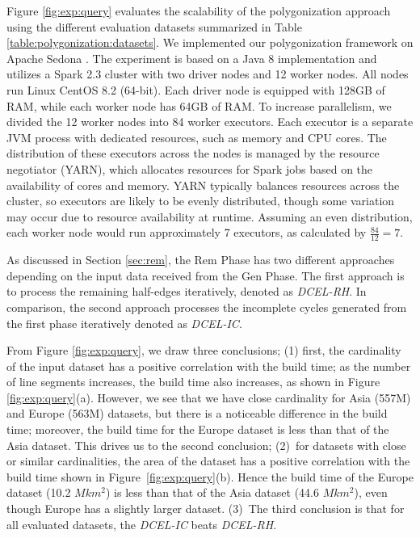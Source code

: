 Figure \ref{fig:exp:query} evaluates the scalability of the polygonization approach using the different evaluation datasets summarized in Table 
\ref{table:polygonization:datasets}.  We implemented our polygonization framework on Apache Sedona \cite{yu_spatial_2018}. The experiment is based on a Java 8  
implementation and utilizes a Spark 2.3 cluster with two driver nodes and 12 worker nodes. All nodes run Linux CentOS 8.2 (64-bit). Each driver node is equipped 
with 128GB of RAM, while each worker node has 64GB of RAM. To increase parallelism, we divided the 12 worker nodes into 84 worker executors. Each executor is a 
separate JVM process with dedicated resources, such as memory and CPU cores. The distribution of these executors across the nodes is managed by the resource 
negotiator (YARN), which allocates resources for Spark jobs based on the availability of cores and memory. YARN typically balances resources across the cluster, 
so executors are likely to be evenly distributed, though some variation may occur due to resource availability at runtime. Assuming an even distribution, each 
worker node would run approximately 7 executors, as calculated by $\frac{84}{12} = 7$.

As discussed in Section \ref{sec:rem}, the Rem Phase has two different approaches depending on the input data received from the Gen Phase. The first approach 
is to process the remaining half-edges iteratively, denoted as \textit{DCEL-RH}. In comparison, the second approach processes the incomplete cycles generated 
from the first phase iteratively denoted as \textit{DCEL-IC}.

From Figure \ref{fig:exp:query}, we draw three conclusions; 
(1) first, the cardinality of the input dataset has a positive correlation with the build time; as the number of line segments increases, the build time also 
increases, as shown in Figure \ref{fig:exp:query}(a). However, we see that we have close cardinality for Asia (557M) and Europe (563M) datasets, but there is a 
noticeable difference in the build time; moreover, the build time for the Europe dataset is less than that of the Asia dataset. 
This drives us to the second conclusion;  
(2)~for datasets with close or similar cardinalities, the area of the dataset has a positive correlation with the build time shown in Figure~\ref{fig:exp:query}(b). 
Hence the build time of the Europe dataset (10.2 $Mkm^2$) is less than that of the Asia dataset (44.6 $Mkm^2$), even though Europe has a slightly larger dataset.
(3)~The third conclusion is that for all evaluated datasets, the \textit{DCEL-IC} beats \textit{DCEL-RH}.

